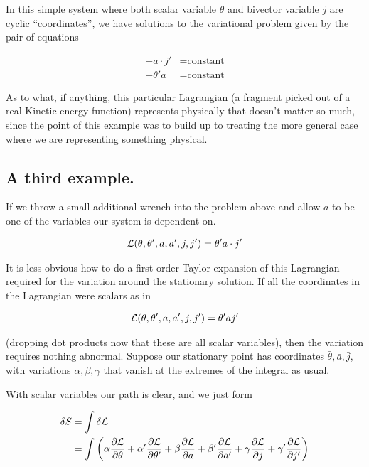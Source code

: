 In this simple system where both scalar variable $\theta$ and bivector variable $j$ are cyclic ``coordinates'', we have solutions to the variational problem given by the pair of equations

\begin{align}\label{eqn:sPolarMultiPendulum:noo8}
- a \cdot j' &= \text{constant} \\
- \theta' a &= \text{constant}
\end{align}

As to what, if anything, this particular Lagrangian (a fragment picked out of a real Kinetic energy function) represents physically that doesn't matter so much, since the point of this example was to build up to treating the more general case where we are representing something physical.

\subsection{A third example.}

If we throw a small additional wrench into the problem above and allow $a$ to be one of the variables our system is dependent on.

\begin{align}\label{eqn:sPolarMultiPendulum:noo9a}
\mathcal{L}(\theta, \theta', a, a', j, j') = \theta' a \cdot j'
\end{align}

It is less obvious how to do a first order Taylor expansion of this Lagrangian required for the variation around the stationary solution.  If all the coordinates in the Lagrangian were scalars as in

\begin{align}\label{eqn:sPolarMultiPendulum:noo9}
\mathcal{L}(\theta, \theta', a, a', j, j') = \theta' a j'
\end{align}

(dropping dot products now that these are all scalar variables), then the variation requires nothing abnormal.  Suppose our stationary point has coordinates $\bar{\theta}, \bar{a}, \bar{j}$, with variations $\alpha, \beta, \gamma$ that vanish at the extremes of the integral as usual.

With scalar variables our path is clear, and we just form

\begin{align*}
\delta S &= \int \delta \mathcal{L} \\
&= 
\int \left( 
\alpha \frac{\partial {\mathcal{L}}}{\partial {\theta}}
+\alpha' \frac{\partial {\mathcal{L}}}{\partial {\theta'}}
+\beta \frac{\partial {\mathcal{L}}}{\partial {a}}
+\beta' \frac{\partial {\mathcal{L}}}{\partial {a'}}
+\gamma \frac{\partial {\mathcal{L}}}{\partial {j}}
+\gamma' \frac{\partial {\mathcal{L}}}{\partial {j'}}
\right) \\
\end{align*}

